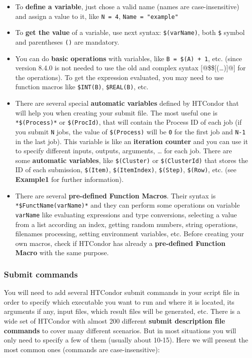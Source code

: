 \documentclass[a4paper,10pt]{article}
\begin{document}
\begin{itemize}
\item To \textbf{define a variable}, just chose a valid name (names are case-insensitive)
and assign a value to it, like \texttt{N = 4}, \texttt{Name = "example"}
\item To \textbf{get the value} of a variable, use next syntax: \texttt{\$(varName)}, both \texttt{\$}
symbol and parentheses \texttt{()} are mandatory.
\item You can do \textbf{basic operations} with variables, like \texttt{B = \$(A) + 1}, etc. (since
version 8.4.0 is not needed to use the old and complex syntax [@\$\$[(\ldots{})]@]
for the operations). To get the expression evaluated, you may need to use
function macros like \texttt{\$INT(B)}, \texttt{\$REAL(B)}, etc.
\item There are several special \textbf{automatic variables} defined by HTCondor that will
help you when creating your submit file. The most useful one is \texttt{*\$(Process)*}
or \texttt{\$(ProcId)}, that will contain the Process ID of each job (if you submit
\texttt{N} jobs, the value of \texttt{\$(Process)} will be \texttt{0} for the first job and \texttt{N-1} in
the last job). This variable is like an \textbf{iteration counter} and you can use it
to specify different inputs, outputs, arguments, \ldots{} for each job. There are
some \textbf{automatic variables}, 
like \texttt{\$(Cluster)} or \texttt{\$(ClusterId)} that stores the ID of each submission,
\texttt{\$(Item)}, \texttt{\$(ItemIndex)}, \texttt{\$(Step)}, \texttt{\$(Row)}, etc. (see \textbf{Example1} for
further information).
\item There are several \textbf{pre-defined Function Macros}. Their syntax is
\texttt{*\$FunctName(varName)*} and they can perform some operations on variable
\texttt{varName} like evaluating expressions and type conversions, selecting a value
from a list according an index, getting random numbers, string operations,
filenames processing, setting environment variables, etc. Before creating your
own macros, check if HTCondor has already a \textbf{pre-defined Function Macro} with
the same purpose.
\end{itemize}

\subsubsection{Submit commands}
\label{sec:org5ccb88a}

You will need to add several HTCondor submit commands in your script file in
order to specify which executable you want to run and where it is located, its
arguments if any, input files, which result files will be generated, etc. There
is a wide set of HTCondor with almost 200 different \textbf{submit description file
commands} to cover many different scenarios. But in most situations you will
only need to specify a few of them (usually about 10-15). Here we will present
the most common ones (commands are case-insensitive):
\end{document}
